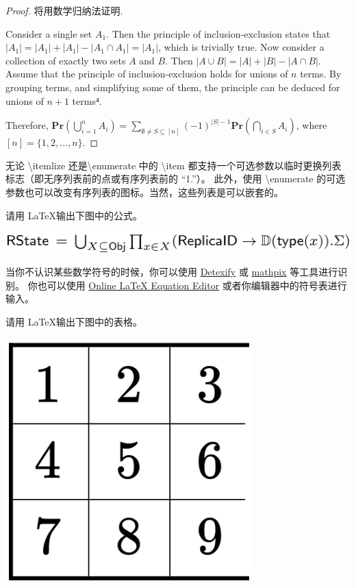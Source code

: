 \documentclass[12pt, a4paper, oneside]{ctexart}
\begin{document}
\begin{proof}

  将用数学归纳法证明.

  Consider a single set $A_1$. Then the principle of inclusion-exclusion states that $|A_1| = |A_1| + | A_1 | - | A_1 \cap A_1 | = | A_1 |$, which is trivially true. Now consider a collection of exactly two sets $A$ and $B$. Then $|A \cup B| = |A| + |B| - |A \cap B|$. Assume that the principle of inclusion-exclusion holds for unions of $n$ terms. By grouping terms, and simplifying some of them, the principle can be deduced for unions of $n+1$ terms⁴.

  Therefore, $\mathbf{Pr}\left( \bigcup_{i=1}^n A_i\right) = \sum_{\emptyset \neq S \subseteq [n]} (-1)^{|S|-1} \mathbf{Pr}\left( \bigcap_{i \in S} A_i \right) $, where $[n]=\{1,2,\ldots,n\}$.


\end{proof}

\begin{note}
  无论 \textbackslash itemlize 还是\textbackslash enumerate 中的 \textbackslash item 都支持一个可选参数以临时更换列表标志（即无序列表前的点或有序列表前的 ``1.''）。
  此外，使用 \textbackslash enumerate 的可选参数也可以改变有序列表的图标。当然，这些列表是可以嵌套的。
\end{note}

\begin{problem}
请用 \LaTeX 输出下图中的公式。

\includegraphics[width=1\textwidth]{figs/formula}
\end{problem}

\begin{solution}

\end{solution}

\begin{note}
  当你不认识某些数学符号的时候，你可以使用 \href{http://detexify.kirelabs.org/classify.html}{Detexify} 或 \href{https://mathpix.com/}{mathpix} 等工具进行识别。
  你也可以使用 \href{https://latex.codecogs.com/legacy/eqneditor/editor.php}{Online LaTeX Equation Editor} 或者你编辑器中的符号表进行输入。
\end{note}

\begin{problem}
请用 \LaTeX 输出下图中的表格。

\includegraphics[width=.3\textwidth]{figs/table}
\end{problem}
\end{document}
